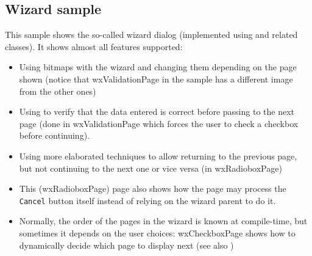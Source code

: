 \subsection{Wizard sample}\label{samplewizard}

This sample shows the so-called wizard dialog (implemented using
 and related classes). It shows almost all
features supported:

\begin{itemize}\itemsep=0pt
\item Using bitmaps with the wizard and changing them depending on the page
shown (notice that wxValidationPage in the sample has a different image from
the other ones)
\item Using 
to verify that the data entered is correct before passing to the next page
(done in wxValidationPage which forces the user to check a checkbox before
continuing).
\item Using more elaborated techniques to allow returning to the previous
page, but not continuing to the next one or vice versa (in wxRadioboxPage)
\item This (wxRadioboxPage) page also shows how the page may process the {\tt
Cancel} button itself instead of relying on the wizard parent to do it.
\item Normally, the order of the pages in the wizard is known at compile-time,
but sometimes it depends on the user choices: wxCheckboxPage shows how to
dynamically decide which page to display next (see also
)
\end{itemize}

